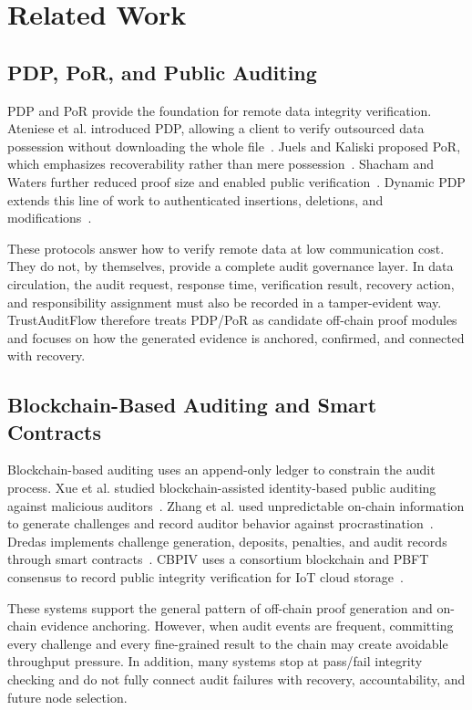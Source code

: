 \section{Related Work}

\subsection{PDP, PoR, and Public Auditing}

PDP and PoR provide the foundation for remote data integrity verification. Ateniese et al. introduced PDP, allowing a client to verify outsourced data possession without downloading the whole file~\cite{ateniese_provable_2007}. Juels and Kaliski proposed PoR, which emphasizes recoverability rather than mere possession~\cite{juels_pors_2007}. Shacham and Waters further reduced proof size and enabled public verification~\cite{shacham_compact_2013}. Dynamic PDP extends this line of work to authenticated insertions, deletions, and modifications~\cite{erway_dynamic_2015}.

These protocols answer how to verify remote data at low communication cost. They do not, by themselves, provide a complete audit governance layer. In data circulation, the audit request, response time, verification result, recovery action, and responsibility assignment must also be recorded in a tamper-evident way. TrustAuditFlow therefore treats PDP/PoR as candidate off-chain proof modules and focuses on how the generated evidence is anchored, confirmed, and connected with recovery.

\subsection{Blockchain-Based Auditing and Smart Contracts}

Blockchain-based auditing uses an append-only ledger to constrain the audit process. Xue et al. studied blockchain-assisted identity-based public auditing against malicious auditors~\cite{xue_identity-based_2019}. Zhang et al. used unpredictable on-chain information to generate challenges and record auditor behavior against procrastination~\cite{zhang_blockchain-based_2021}. Dredas implements challenge generation, deposits, penalties, and audit records through smart contracts~\cite{fan_dredas_2020}. CBPIV uses a consortium blockchain and PBFT consensus to record public integrity verification for IoT cloud storage~\cite{lin_consortium_2022}.

These systems support the general pattern of off-chain proof generation and on-chain evidence anchoring. However, when audit events are frequent, committing every challenge and every fine-grained result to the chain may create avoidable throughput pressure. In addition, many systems stop at pass/fail integrity checking and do not fully connect audit failures with recovery, accountability, and future node selection.

